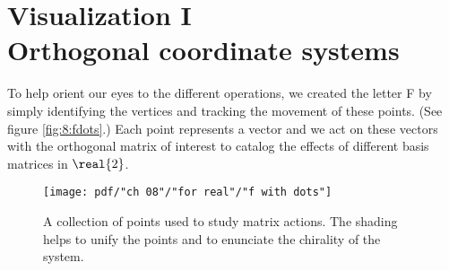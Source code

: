 \section[Visualization I: Orthogonal coordinate systems]{Visualization I\\Orthogonal coordinate systems}
To help orient our eyes to the different operations, we created the letter F by simply identifying the vertices and tracking the movement of these points. (See figure \eqref{fig:8:fdots}.) Each point represents a vector and we act on these vectors with the orthogonal matrix of interest to catalog the effects of different basis matrices in $\real{2}$.
\begin{SCfigure}
  \centering
  \texttt{[image: pdf/"ch 08"/"for real"/"f with dots"]}
  \caption[A collection of points used to study matrix actions]{A collection of points used to study matrix actions. The shading helps to unify the points and to enunciate the chirality of the system.}
\label{fig:8:fdots}
\end{SCfigure}


